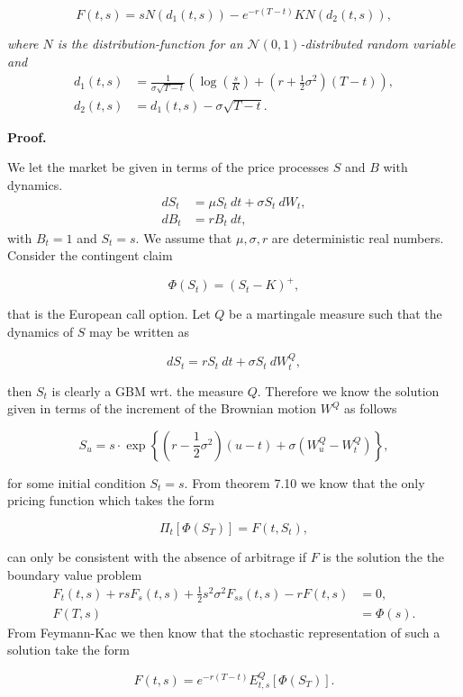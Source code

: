 \documentclass[
]{book}
\begin{document}
\[
F(t,s)=s N(d_1(t,s))-e^{-r(T-t)}KN(d_2(t,s)),\tag{7.52}
\]

\emph{where \(N\) is the distribution-function for an \(\mathcal{N}(0,1)\)-distributed random variable and}
\begin{align*}
d_1(t,s)&=\frac{1}{\sigma \sqrt{T-t}}\left(\log\left(\frac{s}{K}\right)+\left(r+\frac{1}{2}\sigma^2\right)(T-t)\right),\tag{7.53}\\
d_2(t,s)&=d_1(t,s)-\sigma\sqrt{T-t}.\tag{7.54}
\end{align*}

\noindent\makebox[\linewidth]{\rule{\textwidth}{0.4pt}}

\textbf{Proof.}

We let the market be given in terms of the price processes \(S\) and \(B\) with dynamics.
\begin{align*}
dS_t&=\mu S_t\ dt+\sigma S_t\ dW_t,\\
dB_t&=r B_t\ dt,
\end{align*}
with \(B_t=1\) and \(S_t=s\). We assume that \(\mu,\sigma, r\) are deterministic real numbers. Consider the contingent claim

\[
\Phi(S_t)=\left( S_t - K\right)^+,
\]

that is the European call option. Let \(Q\) be a martingale measure such that the dynamics of \(S\) may be written as

\[
dS_t=r S_t\ dt+\sigma S_t\ dW^Q_t,
\]

then \(S_t\) is clearly a GBM wrt. the measure \(Q\). Therefore we know the solution given in terms of the increment of the Brownian motion \(W^Q\) as follows

\[
S_u=s\cdot \exp\left\{\left(r-\frac{1}{2}\sigma^2\right)(u-t)+\sigma\left(W_u^Q-W_t^Q\right)\right\},
\]

for some initial condition \(S_t=s\). From theorem 7.10 we know that the only pricing function which takes the form

\[
\Pi_t[\Phi(S_T)]=F(t,S_t),
\]

can only be consistent with the absence of arbitrage if \(F\) is the solution the the boundary value problem
\begin{align*}
F_t(t,s)+rsF_s(t,s)+\frac{1}{2}s^2\sigma^2F_{ss}(t,s)-rF(t,s)&=0,\\
F(T,s)&=\Phi(s).
\end{align*}
From Feymann-Kac we then know that the stochastic representation of such a solution take the form

\[
F(t,s)=e^{-r(T-t)}E_{t,s}^Q[\Phi(S_T)].
\]
\end{document}
